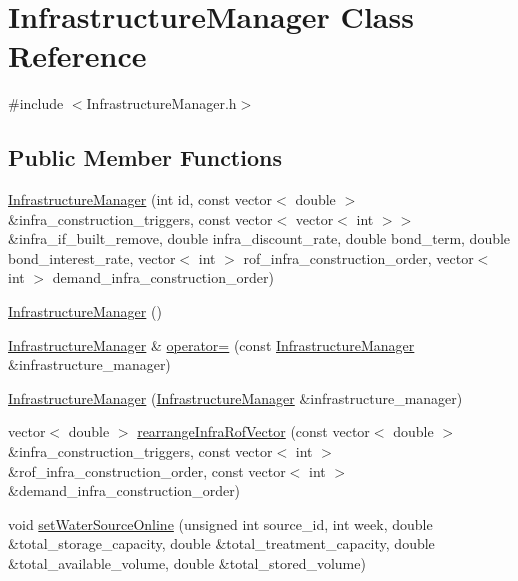\hypertarget{classInfrastructureManager}{}\section{Infrastructure\+Manager Class Reference}
\label{classInfrastructureManager}


{\ttfamily \#include $<$Infrastructure\+Manager.\+h$>$}

\subsection*{Public Member Functions}
\begin{DoxyCompactItemize}
\item 
\mbox{\hyperlink{classInfrastructureManager_a2720f467b660e0f63f265e7957ca0139}{Infrastructure\+Manager}} (int id, const vector$<$ double $>$ \&infra\+\_\+construction\+\_\+triggers, const vector$<$ vector$<$ int $>$$>$ \&infra\+\_\+if\+\_\+built\+\_\+remove, double infra\+\_\+discount\+\_\+rate, double bond\+\_\+term, double bond\+\_\+interest\+\_\+rate, vector$<$ int $>$ rof\+\_\+infra\+\_\+construction\+\_\+order, vector$<$ int $>$ demand\+\_\+infra\+\_\+construction\+\_\+order)
\item 
\mbox{\hyperlink{classInfrastructureManager_a435ec4cb56238c6e1d93e37783f3a03a}{Infrastructure\+Manager}} ()
\item 
\mbox{\hyperlink{classInfrastructureManager}{Infrastructure\+Manager}} \& \mbox{\hyperlink{classInfrastructureManager_a30910bd8edf01ae2899561b49d7719c1}{operator=}} (const \mbox{\hyperlink{classInfrastructureManager}{Infrastructure\+Manager}} \&infrastructure\+\_\+manager)
\item 
\mbox{\hyperlink{classInfrastructureManager_a9d1fe6a0325a3705dbfabb92afbe9055}{Infrastructure\+Manager}} (\mbox{\hyperlink{classInfrastructureManager}{Infrastructure\+Manager}} \&infrastructure\+\_\+manager)
\item 
vector$<$ double $>$ \mbox{\hyperlink{classInfrastructureManager_a48ab4ddeb06417ef7c8657d5c2b6b63a}{rearrange\+Infra\+Rof\+Vector}} (const vector$<$ double $>$ \&infra\+\_\+construction\+\_\+triggers, const vector$<$ int $>$ \&rof\+\_\+infra\+\_\+construction\+\_\+order, const vector$<$ int $>$ \&demand\+\_\+infra\+\_\+construction\+\_\+order)
\item 
void \mbox{\hyperlink{classInfrastructureManager_a9972a27ff6d08b7c1226d703ac700a94}{set\+Water\+Source\+Online}} (unsigned int source\+\_\+id, int week, double \&total\+\_\+storage\+\_\+capacity, double \&total\+\_\+treatment\+\_\+capacity, double \&total\+\_\+available\+\_\+volume, double \&total\+\_\+stored\+\_\+volume)
$$
\end{DoxyCompactItemize}

